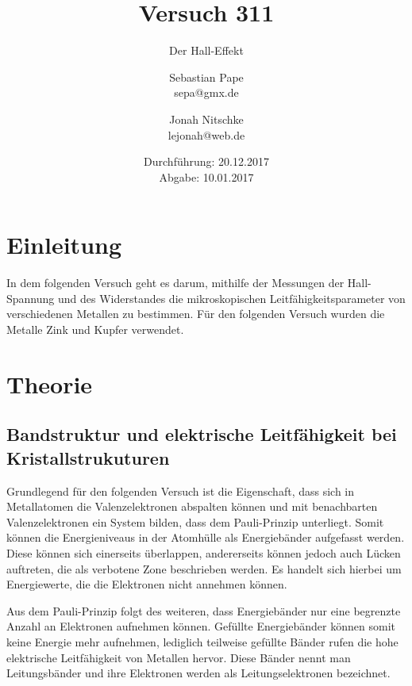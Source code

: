 

\title{Versuch 311}
\subtitle{Der Hall-Effekt}
\author{Sebastian Pape\\
        sepa@gmx.de \and
        Jonah Nitschke\\
        lejonah@web.de}
\date{Durchführung: 20.12.2017\\
      Abgabe: 10.01.2017}


\maketitle

\section{Einleitung}

In dem folgenden Versuch geht es darum, mithilfe der Messungen der Hall-Spannung
und des Widerstandes die mikroskopischen Leitfähigkeitsparameter von verschiedenen
Metallen zu bestimmen. Für den folgenden Versuch wurden die Metalle Zink und Kupfer
verwendet.

\section{Theorie}
\subsection{Bandstruktur und elektrische Leitfähigkeit bei Kristallstrukuturen}

Grundlegend für den folgenden Versuch ist die Eigenschaft, dass sich in Metallatomen
die Valenzelektronen abspalten können und mit benachbarten Valenzelektronen ein
System bilden, dass dem Pauli-Prinzip unterliegt. Somit können die Energieniveaus
in der Atomhülle als Energiebänder aufgefasst werden. Diese können sich einerseits
überlappen, andererseits können jedoch auch Lücken auftreten, die als verbotene
Zone beschrieben werden. Es handelt sich hierbei um Energiewerte, die die Elektronen
nicht annehmen können.

Aus dem Pauli-Prinzip folgt des weiteren, dass Energiebänder nur eine begrenzte
Anzahl an Elektronen aufnehmen können. Gefüllte Energiebänder können somit keine
Energie mehr aufnehmen, lediglich teilweise gefüllte Bänder rufen die hohe elektrische
Leitfähigkeit von Metallen hervor. Diese Bänder nennt man Leitungsbänder und ihre
Elektronen werden als Leitungselektronen bezeichnet.

